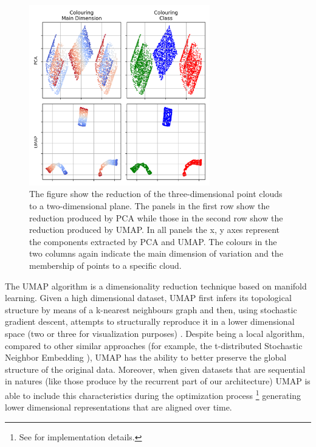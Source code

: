 \begin{figure}[!htb]
  \centering
  \includegraphics[width=0.7\textwidth]{images/chapter_4/reduced.png}
    \caption[\textbf{PCA and UMAP reduction of Swiss roll and square}]{The figure show the reduction of the three-dimensional point clouds to a two-dimensional plane. The panels in the first row show the reduction produced by PCA while those in the second row show the reduction produced by UMAP. In all panels the x, y axes represent the components extracted by PCA and UMAP. The colours in the two columns again indicate the main dimension of variation and the membership of points to a specific cloud.}
    \label{fig: swiss_reduce}
\end{figure}

The UMAP algorithm is a dimensionality reduction technique based on manifold learning. Given a high dimensional dataset, UMAP first infers its topological structure by means of a k-nearest neighbours graph and then, using stochastic gradient descent, attempts to structurally reproduce it in a lower dimensional space (two or three for visualization purposes) \cite{2018arXivUMAP}. Despite being a local algorithm, compared to other similar approaches (for example, the t-distributed Stochastic Neighbor Embedding \cite{van2008visualizing}),  UMAP has the ability to better preserve the global structure of the original data. Moreover, when given datasets that are sequential in natures (like those produce by the recurrent part of our architecture) UMAP is able to include this characteristics during the optimization process \footnote{See \cite{alignedumap} for implementation details.} generating lower dimensional representations that are aligned over time. 

